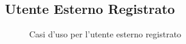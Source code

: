 \subsection{Utente Esterno Registrato}\label{subsec:uc_external_registered}

\begin{figure}[H]
    \centering
    
    \caption{Casi d'uso per l'utente esterno registrato}
\end{figure}

